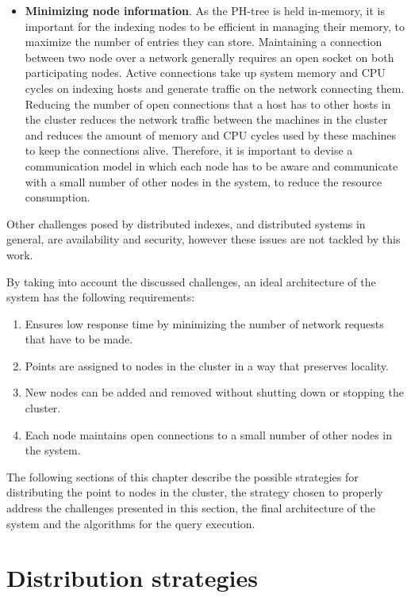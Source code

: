 \documentclass[11pt,a4paper]{globis-book}
\begin{document}
\begin{itemize}
    \item \textbf{Minimizing node information}. As the PH-tree is held in-memory, it is important for the indexing nodes to be efficient in managing their memory, to maximize the number of entries they can store. Maintaining a connection between two node over a network generally requires an open socket on both participating nodes. Active connections take up system memory and CPU cycles on indexing hosts and generate traffic on the network connecting them. Reducing the number of open connections that a host has to other hosts in the cluster reduces the network traffic between the machines in the cluster and reduces the amount of memory and CPU cycles used by these machines to keep the connections alive. Therefore, it is important to devise a communication model in which each node has to be aware and communicate with a small number of other nodes in the system, to reduce the resource consumption.
\end{itemize}

Other challenges posed by distributed indexes, and distributed systems in general, are availability and security, however these issues are not tackled by this work.

By taking into account the discussed challenges, an ideal architecture of the system has the following requirements:
\begin{enumerate}
    \item Ensures low response time by minimizing the number of network requests that have to be made.        
    \item Points are assigned to nodes in the cluster in a way that preserves locality.
    \item New nodes can be added and removed without shutting down or stopping the cluster.
    \item Each node maintains open connections to a small number of other nodes in the system.
\end{enumerate}

The following sections of this chapter describe the possible strategies for distributing the point to nodes in the cluster, the strategy chosen to properly address the challenges presented in this section, the final architecture of the system and the algorithms for the query execution.

\section{Distribution strategies}
\label{sec:distindex-strategies}
\end{document}
